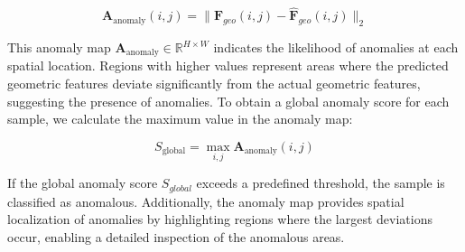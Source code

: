 \begin{equation}
\mathbf{A}_{\text{anomaly}}(i, j) = \|\mathbf{F}_{geo}(i, j) - \hat{\mathbf{F}}_{geo}(i, j)\|_2
\end{equation}

\noindent This anomaly map $\mathbf{A}_{\text{anomaly}} \in \mathbb{R}^{H \times W}$ indicates the likelihood of anomalies at each spatial location. Regions with higher values represent areas where the predicted geometric features deviate significantly from the actual geometric features, suggesting the presence of anomalies. To obtain a global anomaly score for each sample, we calculate the maximum value in the anomaly map:

\begin{equation}
S_{\text{global}} = \max_{i,j} \mathbf{A}_{\text{anomaly}}(i, j)
\end{equation}

\noindent If the global anomaly score $S_{global}$ exceeds a predefined threshold, the sample is classified as anomalous. Additionally, the anomaly map provides spatial localization of anomalies by highlighting regions where the largest deviations occur, enabling a detailed inspection of the anomalous areas. 
